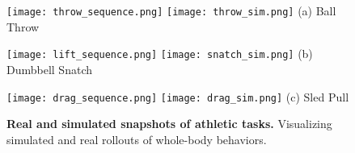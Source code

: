 \begin{figure}
  \centering
    \centering
    \texttt{[image: throw\_sequence.png]}
    \texttt{[image: throw\_sim.png]}
    (a) Ball Throw %
    
    \vspace{0.2cm}
    
    \centering
    \texttt{[image: lift\_sequence.png]}
    \texttt{[image: snatch\_sim.png]}
    (b) Dumbbell Snatch %
    
    \vspace{0.2cm}
    
  
  
      \centering
      \texttt{[image: drag\_sequence.png]}
    \texttt{[image: drag\_sim.png]}
      (c) Sled Pull
    
    \vspace{0.2cm}
    
  \caption{\textbf{Real and simulated snapshots of athletic tasks.} Visualizing simulated and real rollouts of whole-body behaviors. 
  }
  \label{fig:robot_sequences}
\end{figure}